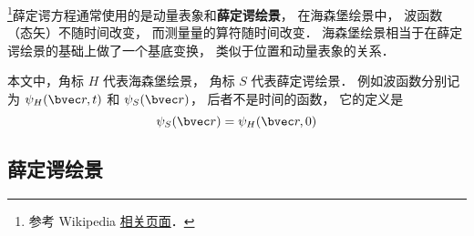 
\begin{issues}
\issueDraft
\end{issues}


\footnote{参考 Wikipedia \href{https://en.wikipedia.org/wiki/Heisenberg_picture}{相关页面}．}薛定谔方程通常使用的是动量表象和\textbf{薛定谔绘景}， 在海森堡绘景中， 波函数（态矢）不随时间改变， 而测量量的算符随时间改变． 海森堡绘景相当于在薛定谔绘景的基础上做了一个基底变换， 类似于位置和动量表象的关系．

本文中，角标 $H$ 代表海森堡绘景， 角标 $S$ 代表薛定谔绘景． 例如波函数分别记为 $\psi_H(\bvec r, t)$ 和 $\psi_S(\bvec r)$， 后者不是时间的函数， 它的定义是
\begin{equation}
\psi_S(\bvec r) = \psi_H(\bvec r, 0)
\end{equation}




\subsection{薛定谔绘景}



















